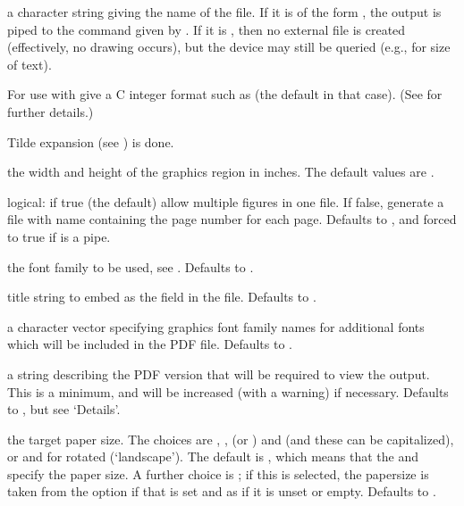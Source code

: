 \begin{Arguments}
\begin{ldescription}
\item[\code{file}] a character string giving the name of the file.
If it is of the form , the output is piped to the
command given by .  If it is ,
then no external file is created (effectively, no drawing occurs),
but the device may still be queried (e.g., for size of text).

For use with  give a C integer format such
as  (the default in that case).
(See  for further details.)

Tilde expansion (see ) is done.

\item[\code{width, height}] the width and height of the graphics region in
inches.  The default values are .
\item[\code{onefile}] logical: if true (the default) allow multiple figures
in one file.  If false, generate a file with name containing the page
number for each page.  Defaults to , and forced to true
if  is a pipe.
\item[\code{family}] the font family to be used, see
.  Defaults to .
\item[\code{title}] title string to embed as the  field in the
file.  Defaults to .
\item[\code{fonts}] a character vector specifying \R{} graphics font family
names for additional fonts which will be included in the PDF file.
Defaults to .
\item[\code{version}] a string describing the PDF version that will be
required to view the output.  This is a minimum, and will be
increased (with a warning) if necessary.  Defaults to ,
but see `Details'.
\item[\code{paper}] the target paper size.  The choices are
, ,  (or ) and
 (and these can be capitalized), or 
and  for rotated (`landscape').
The default is , which means that the 
and  specify the paper size.  A further choice is
; if this is selected, the
papersize is taken from the option 
if that is set and as  if it is unset or empty.
Defaults to .


\end{ldescription}
\end{Arguments}
